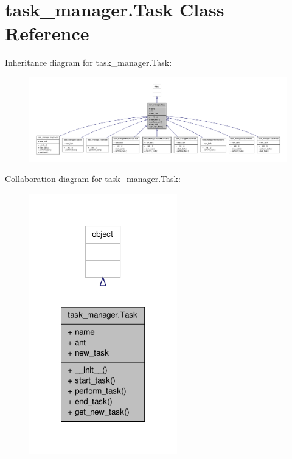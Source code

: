 \hypertarget{classtask__manager_1_1Task}{\section{task\+\_\+manager.\+Task Class Reference}
\label{classtask__manager_1_1Task}
}


Inheritance diagram for task\+\_\+manager.\+Task\+:
\nopagebreak
\begin{figure}[H]
\begin{center}
\leavevmode
\includegraphics[width=350pt]{classtask__manager_1_1Task__inherit__graph}
\end{center}
\end{figure}


Collaboration diagram for task\+\_\+manager.\+Task\+:\nopagebreak
\begin{figure}[H]
\begin{center}
\leavevmode
\includegraphics[width=182pt]{classtask__manager_1_1Task__coll__graph}
\end{center}
\end{figure}
